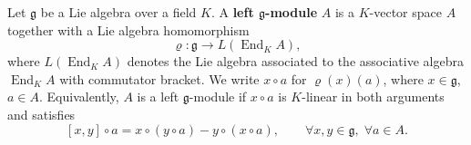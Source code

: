 Let $\mathfrak{g}$ be a Lie algebra over a field $K$. A \textbf{left $\mathfrak{g}$-module} $A$ is a $K$-vector space $A$ together with a Lie algebra homomorphism
$$
\varrho : \mathfrak{g} \longrightarrow L(\operatorname{End}_K A),
$$
where $L(\operatorname{End}_K A)$ denotes the Lie algebra associated to the associative algebra $\operatorname{End}_K A$ with commutator bracket. We write $x \circ a$ for $\varrho(x)(a)$, where $x \in \mathfrak{g}$, $a \in A$. Equivalently, $A$ is a left $\mathfrak{g}$-module if $x \circ a$ is $K$-linear in both arguments and satisfies
$$
[x, y] \circ a = x \circ (y \circ a) - y \circ (x \circ a), \qquad \forall x, y \in \mathfrak{g}, \; \forall a \in A.
$$
